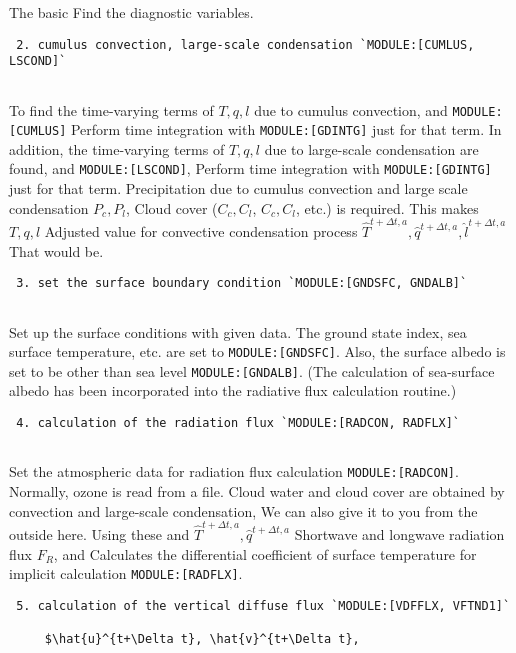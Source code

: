 The basic Find the diagnostic variables.

\begin{verbatim}
 2. cumulus convection, large-scale condensation `MODULE:[CUMLUS, LSCOND]`
     
\end{verbatim}

To find the time-varying terms of \(T, q, l\) due to cumulus convection,
and \texttt{MODULE:{[}CUMLUS{]}} Perform time integration with
\texttt{MODULE:{[}GDINTG{]}} just for that term. In addition, the
time-varying terms of \(T, q, l\) due to large-scale condensation are
found, and \texttt{MODULE:{[}LSCOND{]}}, Perform time integration with
\texttt{MODULE:{[}GDINTG{]}} just for that term. Precipitation due to
cumulus convection and large scale condensation \(P_c, P_l\), Cloud
cover (\(C_c, C_l\), \(C_c, C_l\), etc.) is required. This makes
\(T, q, l\) Adjusted value for convective condensation process
\(\hat{T}^{t+\Delta t,a}, \hat{q}^{t+\Delta t,a}, \hat{l}^{t+\Delta t,a}\)
That would be.

\begin{verbatim}
 3. set the surface boundary condition `MODULE:[GNDSFC, GNDALB]`
     
\end{verbatim}

Set up the surface conditions with given data. The ground state index,
sea surface temperature, etc. are set to \texttt{MODULE:{[}GNDSFC{]}}.
Also, the surface albedo is set to be other than sea level
\texttt{MODULE:{[}GNDALB{]}}. (The calculation of sea-surface albedo has
been incorporated into the radiative flux calculation routine.)

\begin{verbatim}
 4. calculation of the radiation flux `MODULE:[RADCON, RADFLX]`
     
\end{verbatim}

Set the atmospheric data for radiation flux calculation
\texttt{MODULE:{[}RADCON{]}}. Normally, ozone is read from a file. Cloud
water and cloud cover are obtained by convection and large-scale
condensation, We can also give it to you from the outside here. Using
these and \(\hat{T}^{t+\Delta t,a}, \hat{q}^{t+\Delta t,a}\) Shortwave
and longwave radiation flux \(F_R\), and Calculates the differential
coefficient of surface temperature for implicit calculation
\texttt{MODULE:{[}RADFLX{]}}.

\begin{verbatim}
 5. calculation of the vertical diffuse flux `MODULE:[VDFFLX, VFTND1]`
     
     $\hat{u}^{t+\Delta t}, \hat{v}^{t+\Delta t}, 
\end{verbatim}

